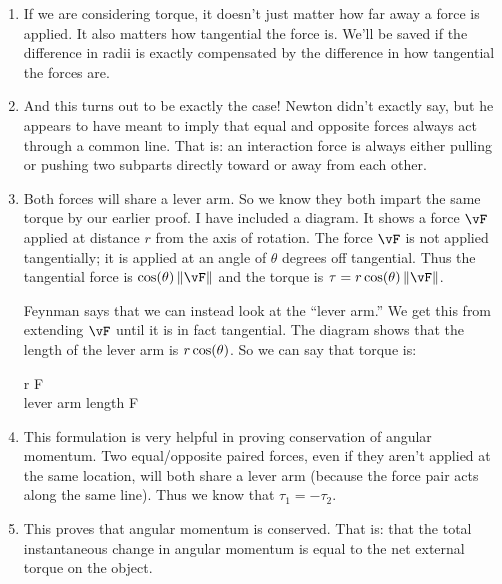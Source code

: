 \begin{enumerate}
  \item If we are considering torque, it doesn't just matter how far
  away a force is applied. It also matters how tangential the force is.
  We'll be saved if the difference in radii is exactly compensated by
  the difference in how tangential the forces are.

  \item And this turns out to be exactly the case! Newton didn't exactly
  say, but he appears to have meant to imply that equal and opposite
  forces always act through a common line. That is: an interaction force
  is always either pulling or pushing two subparts directly toward or
  away from each other.

  \item Both forces will share a lever arm. So we know they both impart
  the same torque by our earlier proof. I have included a diagram. It
  shows a force $\vF$ applied at distance $r$ from the axis of rotation.
  The force $\vF$ is not applied tangentially; it is applied at an angle
  of $\theta$ degrees off tangential. Thus the tangential force is
  $\cosf{\theta} \norm{\vF}$ and the torque is $\tau = r \cosf{\theta}
  \norm{\vF}$.

  Feynman says that we can instead look at the ``lever arm.'' We get
  this from extending $\vF$ until it is in fact tangential. The diagram
  shows that the length of the lever arm is $r \cos\mathopen{}\left( {\theta} \right)\mathclose{}$. So we can
  say that torque is:

  \begin{nedqn}
    \tau
  \eqcol
    r \cosf{\theta} F
  \\
  \eqcol
    \textrm{lever arm length} \cdot F
  \end{nedqn}

  \item This formulation is very helpful in proving conservation of
  angular momentum. Two equal/opposite paired forces, even if they
  aren't applied at the same location, will both share a lever arm
  (because the force pair acts along the same line). Thus we know that
  $\tau_1 = -\tau_2$.

  \item This proves that angular momentum is conserved. That is: that
  the total instantaneous change in angular momentum is equal to the net
  external torque on the object.
\end{enumerate}
